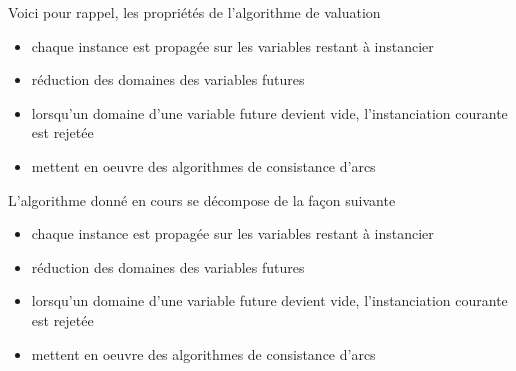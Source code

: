 Voici pour rappel, les propriétés de l'algorithme de valuation \fla
\begin{itemize}
\item chaque instance est propagée sur les variables restant à instancier
\item réduction des domaines des variables futures
\item lorsqu’un domaine d’une variable future devient vide, l’instanciation courante est rejetée
\item mettent en oeuvre des algorithmes de consistance d’arcs
\end{itemize}
L'algorithme \fla donné en cours se décompose de la façon suivante
\begin{itemize}
\item chaque instance est propagée sur les variables restant à instancier
\item réduction des domaines des variables futures
\item lorsqu’un domaine d’une variable future devient vide, l’instanciation courante est rejetée
\item mettent en oeuvre des algorithmes de consistance d’arcs
\end{itemize}